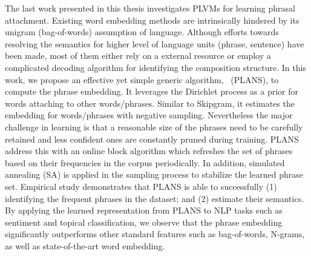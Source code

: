 The last work presented in this thesis investigates PLVMs for learning phrasal
attachment. Existing word embedding methods are intrinsically hindered by its
unigram (bag-of-words) assumption of language. Although efforts towards
resolving the semantics for higher level of language units (\eg phrase,
sentence) have been made, most of them either rely on a external resource or
employ a complicated decoding algorithm for identifying the composition
structure. In this work, we propose an effective yet simple generic algorithm,
\PLANS{}~(PLANS), to compute the phrase embedding. It leverages the Dirichlet
process as a prior for words attaching to other words/phrases. Similar to
Skipgram, it estimates the embedding for words/phrases with negative sampling.
Nevertheless the major challenge in learning is that a reasonable size of the
phrases need to be carefully retained and less confident ones are constantly
pruned during training. PLANS address this with an online block algorithm which
refreshes the set of phrases based on their frequencies in the corpus
periodically. In addition, simulated annealing (SA) is applied in the sampling
process to stabilize the learned phrase set. Empirical study demonstrates that
PLANS is able to successfully (1) identifying the frequent phrases in the
dataset; and (2) estimate their semantics. By applying the learned
representation from PLANS to NLP tasks such as sentiment and topical
classification, we observe that the phrase embedding significantly outperforms
other standard features such as bag-of-words, N-grams, as well as
state-of-the-art word embedding.

